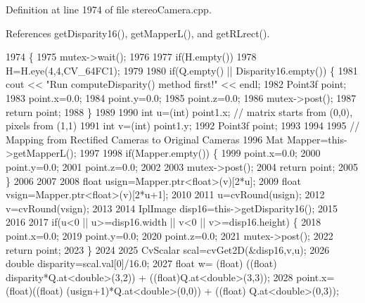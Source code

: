 Definition at line 1974 of file stereo\+Camera.\+cpp.



References get\+Disparity16(), get\+Mapper\+L(), and get\+R\+Lrect().


\begin{DoxyCode}
1974                                                                                   \{
1975     mutex->wait();
1976 
1977     \textcolor{keywordflow}{if}(H.empty())
1978         H=H.eye(4,4,CV\_64FC1);
1979 
1980     \textcolor{keywordflow}{if}(Q.empty() || Disparity16.empty()) \{
1981         cout << \textcolor{stringliteral}{"Run computeDisparity() method first!"} << endl;
1982         Point3f point;
1983         point.x=0.0;
1984         point.y=0.0;
1985         point.z=0.0;
1986         mutex->post();
1987         \textcolor{keywordflow}{return} point;
1988     \}
1989 
1990     \textcolor{keywordtype}{int} u=(int) point1.x; \textcolor{comment}{// matrix starts from (0,0), pixels from (1,1)}
1991     \textcolor{keywordtype}{int} v=(\textcolor{keywordtype}{int}) point1.y;
1992     Point3f point;
1993 
1994 
1995     \textcolor{comment}{// Mapping from Rectified Cameras to Original Cameras}
1996     Mat Mapper=this->getMapperL();
1997 
1998     \textcolor{keywordflow}{if}(Mapper.empty()) \{
1999         point.x=0.0;
2000         point.y=0.0;
2001         point.z=0.0;
2002         
2003         mutex->post();
2004         \textcolor{keywordflow}{return} point;
2005     \}
2006 
2007 
2008     \textcolor{keywordtype}{float} usign=Mapper.ptr<\textcolor{keywordtype}{float}>(v)[2*u];
2009     \textcolor{keywordtype}{float} vsign=Mapper.ptr<\textcolor{keywordtype}{float}>(v)[2*u+1]; 
2010 
2011     u=cvRound(usign);
2012     v=cvRound(vsign);
2013 
2014     IplImage disp16=this->getDisparity16();
2015     
2016 
2017     \textcolor{keywordflow}{if}(u<0 || u>=disp16.width || v<0 || v>=disp16.height) \{
2018         point.x=0.0;
2019         point.y=0.0;
2020         point.z=0.0;
2021         mutex->post();
2022         \textcolor{keywordflow}{return} point;
2023     \}
2024 
2025     CvScalar scal=cvGet2D(&disp16,v,u);
2026     \textcolor{keywordtype}{double} disparity=scal.val[0]/16.0;
2027     \textcolor{keywordtype}{float} w= (float) ((\textcolor{keywordtype}{float}) disparity*Q.at<\textcolor{keywordtype}{double}>(3,2)) + ((float)Q.at<\textcolor{keywordtype}{double}>(3,3));
2028     point.x= (float)((\textcolor{keywordtype}{float}) (usign+1)*Q.at<\textcolor{keywordtype}{double}>(0,0)) + ((\textcolor{keywordtype}{float}) Q.at<\textcolor{keywordtype}{double}>(0,3));

\end{DoxyCode}
